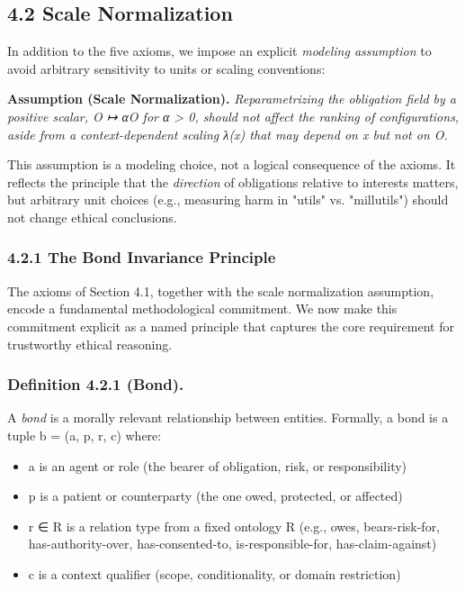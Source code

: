 \documentclass[12pt]{article}
\theoremstyle{plain}
\theoremstyle{definition}
\theoremstyle{remark}
\begin{document}
\subsection{4.2 Scale Normalization}\label{scale-normalization}

In addition to the five axioms, we impose an explicit \emph{modeling
assumption} to avoid arbitrary sensitivity to units or scaling
conventions:

\textbf{Assumption (Scale Normalization).} \emph{Reparametrizing the
obligation field by a positive scalar, O ↦ αO for α \textgreater{} 0,
should not affect the ranking of configurations, aside from a
context-dependent scaling λ(x) that may depend on x but not on O.}

This assumption is a modeling choice, not a logical consequence of the
axioms. It reflects the principle that the \emph{direction} of
obligations relative to interests matters, but arbitrary unit choices
(e.g., measuring harm in "utils" vs. "millutils") should not change
ethical conclusions.

\subsubsection{4.2.1 The Bond Invariance
Principle}\label{the-bond-invariance-principle}

The axioms of Section 4.1, together with the scale normalization
assumption, encode a fundamental methodological commitment. We now make
this commitment explicit as a named principle that captures the core
requirement for trustworthy ethical reasoning.

\subsubsection{\texorpdfstring{Definition 4.2.1 (Bond).
}{Definition 4.2.1 (Bond). }}\label{definition-4.2.1-bond.}

A \emph{bond} is a morally relevant relationship between entities.
Formally, a bond is a tuple b = (a, p, r, c) where:

\begin{itemize}
\item
  a is an agent or role (the bearer of obligation, risk, or
  responsibility)
\item
  p is a patient or counterparty (the one owed, protected, or affected)
\item
  r ∈ R is a relation type from a fixed ontology R (e.g., owes,
  bears-risk-for, has-authority-over, has-consented-to,
  is-responsible-for, has-claim-against)
\item
  c is a context qualifier (scope, conditionality, or domain
  restriction)
\end{itemize}
\end{document}
